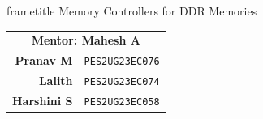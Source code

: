 \documentclass[aspectratio=169,10pt]{beamer}
\date{}
\begin{document}

\begin{frame}[plain]
  \begin{beamercolorbox}[wd=\paperwidth,ht=0.22\paperheight,dp=0pt,
      center,sep=10pt]{frametitle}
    \color{white}Memory Controllers for DDR Memories
  \end{beamercolorbox}
  \vspace{20pt}
  \begin{center}
    \begin{tabular}{rl}
      \multicolumn{2}{c}{\textbf{Mentor: Mahesh A}}\\[8pt]
      \textbf{Pranav M}   & \texttt{PES2UG23EC076}\\[6pt]
      \textbf{Lalith}     & \texttt{PES2UG23EC074}\\[6pt]
      \textbf{Harshini S} & \texttt{PES2UG23EC058}\\
    \end{tabular}
  \end{center}
\end{frame}
\end{document}
